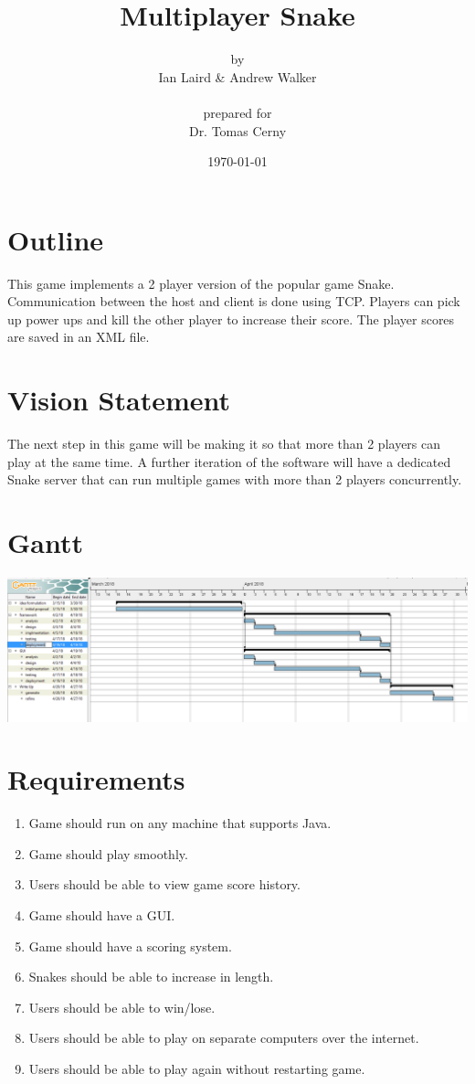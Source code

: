 \documentclass[titlepage]{article}
\title{{\Huge Multiplayer Snake}\\\vspace{3mm}{\large Software Engineering 1 \& Intro to Java}}
\date{\today}
\author{{\normalsize by}\\{\large Ian Laird \& Andrew Walker}\\ \\ {\normalsize prepared for}\\Dr. Tomas Cerny}
\begin{document}
	\maketitle
	\section{Outline}
	This game implements a 2 player version of the popular game Snake. Communication between the host and client is done using TCP. Players can pick up power ups and kill the other player to increase their score. The player scores are saved in an XML file.

	\section{Vision Statement}
	The next step in this game will be making it so that more than 2 players can play at the same time. A further iteration of the software will have a dedicated Snake server that can run multiple games with more than 2 players concurrently.
	
	\section{Gantt}
	\includegraphics[scale=.50]{gantt2}
	
	\section{Requirements}
	\begin{enumerate}
		\item Game should run on any machine that supports Java.
		\item Game should play smoothly.
		\item Users should be able to view game score history.
		\item Game should have a GUI.
		\item Game should have a scoring system.
		\item Snakes should be able to increase in length.
		\item Users should be able to win/lose.
		\item Users should be able to play on separate computers over the internet.
		\item Users should be able to play again without restarting game.
	\end{enumerate}
	
\end{document}
